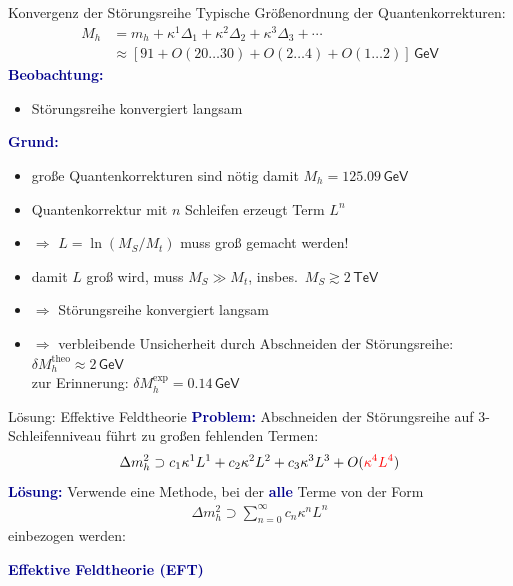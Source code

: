 \documentclass[hyperref={pdfpagelabels=false},ngerman]{beamer}
\newcommand{\eh}[1]{\,\mathsf{#1}}
\newcommand{\MS}{\ensuremath{M_S}}
\newcommand{\mycite}[1]{\ensuremath{\text{\textcolor{darkgray}{\tiny [#1]}}}}
\renewcommand{\emph}[1]{\textbf{\textcolor{darkblue}{#1}}}
\newcommand{\GeV}{\eh{GeV}}
\newcommand{\TeV}{\eh{TeV}}
\begin{document}
\begin{frame}{Konvergenz der Störungsreihe}
  Typische Größenordnung der Quantenkorrekturen:
  \begin{align*}
    M_h &= m_h + \kappa^1\Delta_1 + \kappa^2\Delta_2 + \kappa^3\Delta_3 + \cdots \\
    &\approx [91 + O(20\ldots 30) + O(2\ldots 4) + O(1\ldots 2)] \GeV
  \end{align*}
  \emph{Beobachtung:}
  \begin{itemize}
  \item Störungsreihe konvergiert langsam
  \end{itemize}
  \emph{Grund:}
  \begin{itemize}
  \item große Quantenkorrekturen sind nötig damit $M_h = 125.09\GeV$
  \item Quantenkorrektur mit $n$ Schleifen erzeugt Term $L^n$
  \item $\Rightarrow$ $L=\ln(\MS / M_t)$ muss groß gemacht werden!
  \item damit $L$ groß wird, muss $\MS \gg M_t$, insbes.\
    $\MS \gtrsim 2\TeV$
  \item $\Rightarrow$ Störungsreihe konvergiert langsam
  \item $\Rightarrow$ verbleibende Unsicherheit durch Abschneiden der
    Störungsreihe: $\delta M_h^{\text{theo}} \approx 2\GeV$ \\
    zur Erinnerung: $\delta M_h^{\text{exp}} = 0.14\GeV$
  \end{itemize}
\end{frame}

\begin{frame}{Unsicherheitsabschätzung}
  \begin{center}
    \texttt{[image: \{\{plots/SOFTSUSY/SS\_TB-20\_Xt--sqrt6]}}}
  \end{center}
  \raggedleft\mycite{1804.09410}
\end{frame}

\begin{frame}{Lösung: Effektive Feldtheorie}
  \emph{Problem:} Abschneiden der Störungsreihe auf 3-Schleifenniveau
  führt zu großen fehlenden Termen:
  \begin{align*}
    \Delta m_h^2\supset c_1 \kappa^1 L^1 + c_2 \kappa^2 L^2 + c_3 \kappa^3 L^3
    + O(\textcolor{red}{\kappa^4 L^4})
  \end{align*}
  \pause
  \emph{Lösung:} Verwende eine Methode, bei der \emph{alle} Terme von der Form
  \begin{align*}
    \Delta m_h^2 \supset \sum_{n=0}^\infty c_n \kappa^n L^n
  \end{align*}
  einbezogen werden:
  \begin{center}
    \emph{Effektive Feldtheorie (EFT)}
  \end{center}
\end{frame}
\end{document}
